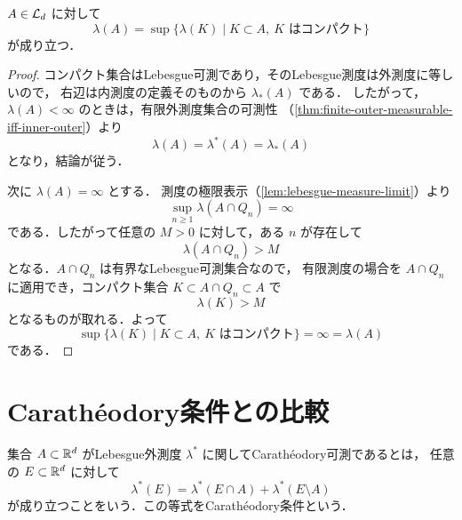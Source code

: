 \begin{theorem}[内正則性]\label{thm:lebesgue-measure-inner-regularity}
$A\in\mathcal L_d$ に対して
\[
\lambda(A)
=
\sup\{\lambda(K)\mid K\subset A,\ K\text{ はコンパクト}\}
\]
が成り立つ．
\end{theorem}
\begin{proof}
コンパクト集合はLebesgue可測であり，そのLebesgue測度は外測度に等しいので，
右辺は内測度の定義そのものから $\lambda_*(A)$ である．
したがって，$\lambda(A)<\infty$ のときは，有限外測度集合の可測性
（\cref{thm:finite-outer-measurable-iff-inner-outer}）より
\[
\lambda(A)=\lambda^*(A)=\lambda_*(A)
\]
となり，結論が従う．

次に $\lambda(A)=\infty$ とする．
測度の極限表示（\cref{lem:lebesgue-measure-limit}）より
\[
\sup_{n\ge1}\lambda(A\cap Q_n)=\infty
\]
である．したがって任意の $M>0$ に対して，ある $n$ が存在して
\[
\lambda(A\cap Q_n)>M
\]
となる．$A\cap Q_n$ は有界なLebesgue可測集合なので，
有限測度の場合を $A\cap Q_n$ に適用でき，コンパクト集合
$K\subset A\cap Q_n\subset A$ で
\[
\lambda(K)>M
\]
となるものが取れる．よって
\[
\sup\{\lambda(K)\mid K\subset A,\ K\text{ はコンパクト}\}=\infty=\lambda(A)
\]
である．
\end{proof}

\section{Carathéodory条件との比較}\label{sec:lebesgue-caratheodory-comparison}

\begin{definition}[Lebesgue外測度に関するCarathéodory可測性]\label{def:lebesgue-caratheodory-measurable}
集合 $A\subset\mathbb R^d$ がLebesgue外測度 $\lambda^*$ に関してCarathéodory可測であるとは，
任意の $E\subset\mathbb R^d$ に対して
\[
\lambda^*(E)
=
\lambda^*(E\cap A)+\lambda^*(E\setminus A)
\]
が成り立つことをいう．この等式をCarathéodory条件という．
\end{definition}

